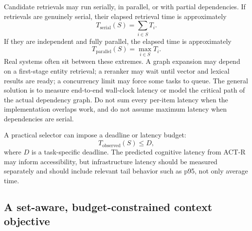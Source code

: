 Candidate retrievals may run serially, in parallel, or with partial dependencies. If retrievals are genuinely serial, their elapsed retrieval time is approximately
\begin{equation}
  T_{\mathrm{serial}}(S)=\sum_{i\in S}T_i.
\end{equation}
If they are independent and fully parallel, the elapsed time is approximately
\begin{equation}
  T_{\mathrm{parallel}}(S)=\max_{i\in S}T_i.
\end{equation}
Real systems often sit between these extremes. A graph expansion may depend on a first-stage entity retrieval; a reranker may wait until vector and lexical results are ready; a concurrency limit may force some tasks to queue. The general solution is to measure end-to-end wall-clock latency or model the critical path of the actual dependency graph. Do not sum every per-item latency when the implementation overlaps work, and do not assume maximum latency when dependencies are serial.

A practical selector can impose a deadline or latency budget:
\begin{equation}
  T_{\mathrm{observed}}(S)\leq D,
  \label{eq:ch12-latency-budget}
\end{equation}
where \(D\) is a task-specific deadline. The predicted cognitive latency from ACT-R may inform accessibility, but infrastructure latency should be measured separately and should include relevant tail behavior such as p95, not only average time.

\subsection{A set-aware, budget-constrained context objective}
\label{subsec:ch12-context-objective}

